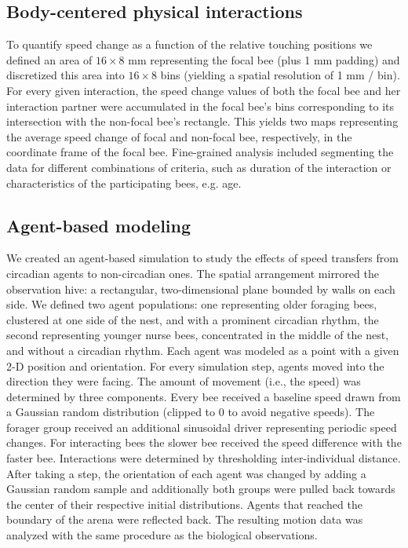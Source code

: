 \documentclass{article}
\begin{document}
\subsection*{Body-centered physical interactions}
To quantify speed change as a function of the relative touching positions we defined an area of $16 \times 8$ mm representing the focal bee (plus 1 mm padding) and discretized this area into $16 \times 8$ bins (yielding a spatial resolution of 1 mm / bin). For every given interaction, the speed change values of both the focal bee and her interaction partner were accumulated in the focal bee’s bins corresponding to its intersection with the non-focal bee’s rectangle. This yields two maps representing the average speed change of focal and non-focal bee, respectively, in the coordinate frame of the focal bee.   Fine-grained analysis included segmenting the data for different combinations of criteria, such as duration of the interaction or characteristics of the participating bees, e.g. age.

\subsection*{Agent-based modeling}
We created an agent-based simulation to study the effects of speed transfers from circadian agents to non-circadian ones. The spatial arrangement mirrored the observation hive: a rectangular, two-dimensional plane bounded by walls on each side. We defined two agent populations: one representing older foraging bees, clustered at one side of the nest, and with a prominent circadian rhythm, the second representing younger nurse bees, concentrated in the middle of the nest, and without a circadian rhythm. Each agent was modeled as a point with a given 2-D position and orientation. For every simulation step, agents moved into the direction they were facing. The amount of movement (i.e., the speed) was determined by three components. Every bee received a baseline speed drawn from a Gaussian random distribution (clipped to 0 to avoid negative speeds). The forager group received an additional sinusoidal driver representing periodic speed changes. For interacting bees the slower bee received the speed difference with the faster bee. Interactions were determined by thresholding inter-individual distance. After taking a step, the orientation of each agent was changed by adding a Gaussian random sample and additionally both groups were pulled back towards the center of their respective initial distributions. Agents that reached the boundary of the arena were reflected back. The resulting motion data was analyzed with the same procedure as the biological observations.
\end{document}
